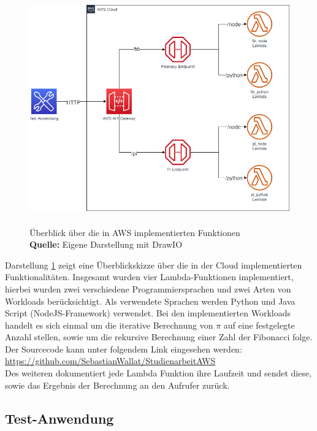 \documentclass[12pt,a4paper,parskip=half]{scrreprt}
\newcommand*{\captionsource}[2]{%
	\caption[{#1}]{%
		#1%
		\\\hspace{\linewidth}%
		\textbf{Quelle:} #2%
	}%
}
\begin{document}
\FloatBarrier
\begin{figure}[h!]
	\centering
	\includegraphics[width=14cm, height=10cm]{LambdaLayout}
	\captionsource{Überblick über die in AWS implementierten Funktionen}
	{Eigene Darstellung mit DrawIO}
	\label{Lambda_Aufbau}
\end{figure}

Darstellung \ref{Lambda_Aufbau} zeigt eine Überblickskizze über die in der Cloud implementierten Funktionalitäten. Insgesamt wurden vier Lambda-Funktionen implementiert, hierbei wurden zwei verschiedene Programmiersprachen und zwei Arten von Workloads berücksichtigt. Als verwendete Sprachen werden Python und Java Script (NodeJS-Framework) verwendet. Bei den implementierten Workloads handelt es sich einmal um die iterative Berechnung von $\pi$ auf eine festgelegte Anzahl stellen, sowie um die rekursive Berechnung einer Zahl der Fibonacci folge. Der Sourcecode kann unter folgendem Link eingesehen werden: \url{https://github.com/SebastianWallat/StudienarbeitAWS}
\\
Des weiteren dokumentiert jede Lambda Funktion ihre Laufzeit und sendet diese, sowie das Ergebnis der Berechnung an den Aufrufer zurück.


\subsection{Test-Anwendung}
\end{document}
